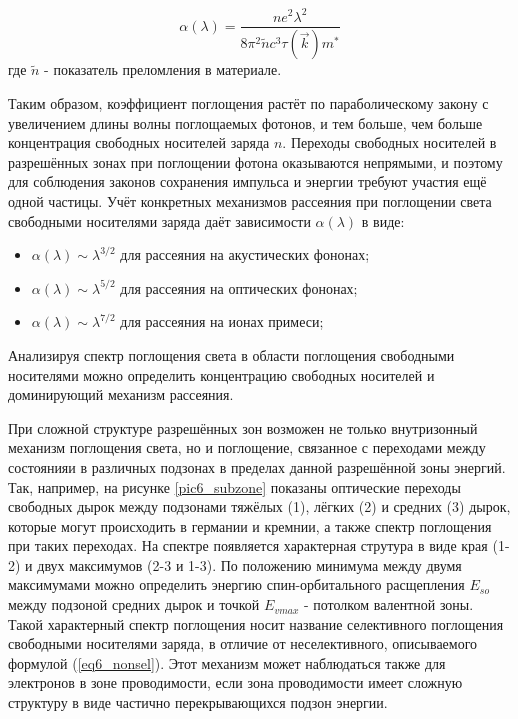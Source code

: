 \begin{equation}
\alpha(\lambda) = \frac{n e^2 \lambda^2}{8 \pi^2 \tilde{n} c^3 \tau(\overrightarrow{k}) m^{*}}
\label{eq6_nonsel}
\end{equation}
где $\tilde{n}$ - показатель преломления в материале.

Таким образом, коэффициент поглощения растёт по параболическому закону с увеличением длины волны поглощаемых фотонов, и тем больше, чем больше концентрация свободных носителей заряда $n$. Переходы свободных носителей в разрешённых зонах при поглощении фотона оказываются непрямыми, и поэтому для соблюдения законов сохранения импульса и энергии требуют участия ещё одной частицы. Учёт конкретных механизмов рассеяния при поглощении света свободными носителями заряда даёт зависимости $\alpha(\lambda)$ в виде:

\begin{itemize}
\item $\alpha(\lambda) \sim \lambda^{3/2}$ для рассеяния на акустических фононах;
\item $\alpha(\lambda) \sim \lambda^{5/2}$ для рассеяния на оптических фононах;
\item $\alpha(\lambda) \sim \lambda^{7/2}$ для рассеяния на ионах примеси;
\end{itemize}

Анализируя спектр поглощения света в области поглощения свободными носителями можно определить концентрацию свободных носителей и доминирующий механизм рассеяния.

При сложной структуре разрешённых зон возможен не только внутризонный механизм поглощения света, но и поглощение, связанное с переходами между состоянияи в различных подзонах в пределах данной разрешённой зоны энергий. Так, например, на рисунке \ref{pic6_subzone} показаны оптические переходы свободных дырок между подзонами тяжёлых (1), лёгких (2) и средних (3) дырок, которые могут происходить в германии и кремнии, а также спектр поглощения при таких переходах. На спектре появляется характерная струтура в виде края (1-2) и двух максимумов (2-3 и 1-3). По положению минимума между двумя максимумами можно определить энергию спин-орбитального расщепления $E_{so}$ между подзоной средних дырок и точкой $E_{v max}$ - потолком валентной зоны. Такой характерный спектр поглощения носит название селективного поглощения свободными носителями заряда, в отличие от неселективного, описываемого формулой (\ref{eq6_nonsel}). Этот механизм может наблюдаться также для электронов в зоне проводимости, если зона проводимости имеет сложную структуру в виде частично перекрывающихся подзон энергии.


